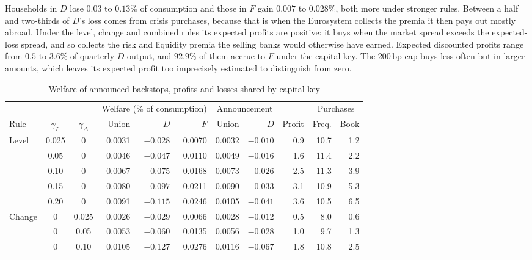 Households in $D$ lose $0.03$ to
$0.13\%$ of consumption and those in $F$ gain $0.007$ to $0.028\%$, both more under stronger rules.
Between a half and two-thirds of $D$'s loss comes from crisis purchases, because that is when the
Eurosystem collects the premia it then pays out mostly abroad. Under the level, change and combined
rules its expected profits are positive: it buys when the market spread exceeds the expected-loss
spread, and so collects the risk and liquidity premia the selling banks would otherwise have earned.
Expected discounted profits range from $0.5$ to $3.6\%$ of quarterly $D$ output, and $92.9\%$ of them
accrue to $F$ under the capital key. The 200\,bp cap buys less often but in larger amounts, which
leaves its expected profit too imprecisely estimated to distinguish from zero.

\begin{table}[tbp]
  \centering
  \begin{threeparttable}
  \caption{Welfare of announced backstops, profits and losses shared by capital key}
  \label{tab:welfare}
  \footnotesize\setlength{\tabcolsep}{3.5pt}
  \begin{tabular}{lcc rrr rr r rr}
    \toprule
    & & & \multicolumn{3}{c}{Welfare (\% of consumption)} & \multicolumn{2}{c}{Announcement}
      & & \multicolumn{2}{c}{Purchases} \\
    \cmidrule(lr){4-6}\cmidrule(lr){7-8}\cmidrule(lr){10-11}
    Rule & $\gamma_L$ & $\gamma_\Delta$ & Union & $D$ & $F$ & Union & $D$
      & Profit & Freq. & Book \\
    \midrule
    Level & 0.025 & 0 & 0.0031 & $-0.028$ & 0.0070 & 0.0032 & $-0.010$ & 0.9 & 10.7 & 1.2 \\
     & 0.05 & 0 & 0.0046 & $-0.047$ & 0.0110 & 0.0049 & $-0.016$ & 1.6 & 11.4 & 2.2 \\
     & 0.10 & 0 & 0.0067 & $-0.075$ & 0.0168 & 0.0073 & $-0.026$ & 2.5 & 11.3 & 3.9 \\
     & 0.15 & 0 & 0.0080 & $-0.097$ & 0.0211 & 0.0090 & $-0.033$ & 3.1 & 10.9 & 5.3 \\
     & 0.20 & 0 & 0.0091 & $-0.115$ & 0.0246 & 0.0105 & $-0.041$ & 3.6 & 10.5 & 6.5 \\
    Change & 0 & 0.025 & 0.0026 & $-0.029$ & 0.0066 & 0.0028 & $-0.012$ & 0.5 & 8.0 & 0.6 \\
     & 0 & 0.05 & 0.0053 & $-0.060$ & 0.0135 & 0.0056 & $-0.028$ & 1.0 & 9.7 & 1.3 \\
     & 0 & 0.10 & 0.0105 & $-0.127$ & 0.0276 & 0.0116 & $-0.067$ & 1.8 & 10.8 & 2.5 \\

\end{tabular}
\end{threeparttable}
\end{table}
